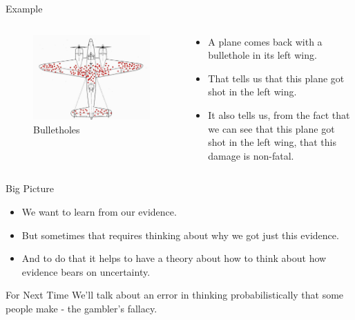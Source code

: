 \documentclass[
  ignorenonframetext,
]{beamer}
\providecommand{\tightlist}{%
  \setlength{\itemsep}{0pt}\setlength{\parskip}{0pt}}
\renewcommand{\,}{\text{, }}
\begin{document}
\begin{frame}{Example}
\protect\hypertarget{example}{}
\begin{columns}[c]
\begin{column}{0.48\textwidth}
\begin{figure}
\centering
\includegraphics{../images/week10/wald_plane.jpg}
\caption{Bulletholes}
\end{figure}
\end{column}

\begin{column}{0.48\textwidth}
\begin{itemize}
\tightlist
\item
  A plane comes back with a bullethole in its left wing.
\item
  That tells us that this plane got shot in the left wing.
\item
  It also tells us, from the fact that we can see that this plane got
  shot in the left wing, that this damage is non-fatal.
\end{itemize}
\end{column}
\end{columns}
\end{frame}

\begin{frame}{Big Picture}
\protect\hypertarget{big-picture}{}
\begin{itemize}
\tightlist
\item
  We want to learn from our evidence.
\item
  But sometimes that requires thinking about why we got just this
  evidence.
\item
  And to do that it helps to have a theory about how to think about how
  evidence bears on uncertainty.
\end{itemize}
\end{frame}

\begin{frame}{For Next Time}
\protect\hypertarget{for-next-time}{}
We'll talk about an error in thinking probabilistically that some people
make - the gambler's fallacy.
\end{frame}
\end{document}
